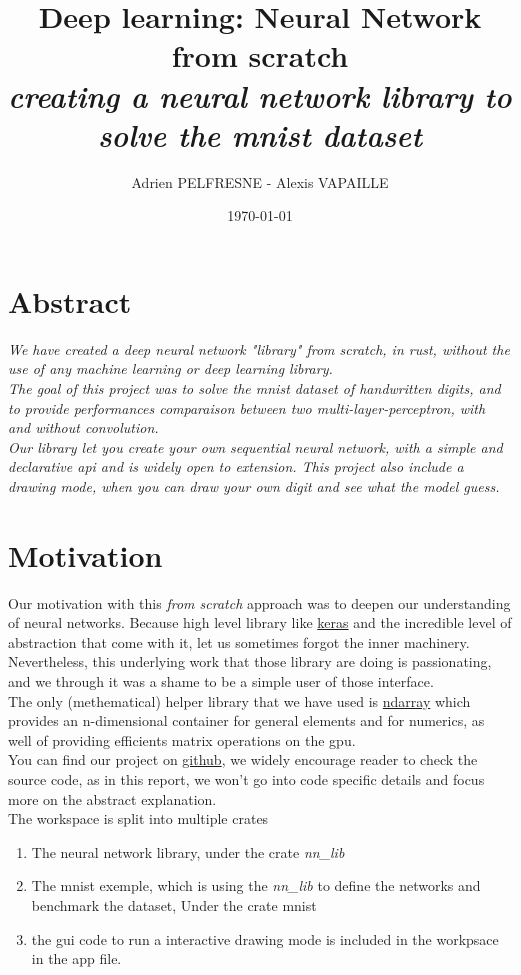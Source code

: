 \documentclass[a4paper, twocolumn, twoside]{article}
\title{Deep learning: Neural Network from scratch\\
\textit{creating a neural network library to solve the mnist dataset}}
\author{Adrien PELFRESNE - Alexis VAPAILLE}
\date{\today}
\begin{document}
	\onecolumn
    \maketitle
	\tableofcontents

	\twocolumn
	\section{Abstract}
	\textit{We have created a deep neural network "library" from scratch, in rust, without the use of any machine learning or deep learning library.\\
	The goal of this project was to solve the mnist dataset of handwritten digits, and to provide performances comparaison between
	two multi-layer-perceptron, with and without convolution.\\
	Our library let you create your own sequential neural network, with a simple and declarative api and is widely open to extension.
	This project also include a drawing mode, when you can draw your own digit and see what the model guess.
	}

	\section{Motivation}
	Our motivation with this \textit{from scratch} approach was to deepen our understanding of neural networks.
	Because high level library like \href{https://keras.io/}{keras} and the incredible level of abstraction that come with it,
	let us sometimes forgot the inner machinery. Nevertheless,
	this underlying work that those library are doing is passionating, and we through it was a shame to be a simple user of those interface.\\
	The only (methematical) helper library that we have used is \href{https://crates.io/crates/ndarray}{ndarray}
	which provides an n-dimensional container for general elements
	and for numerics, as well of providing efficients matrix operations on the gpu.\\
	You can find our project on \href{https://github.com/dirdr/neural_network_from_scratch}{github}, we widely encourage reader to check the source code,
	as in this report, we won't go into code specific details and focus more on the abstract explanation.\\
	The workspace is split into multiple crates
	\begin{enumerate}
		\item The neural network library, under the crate \textit{nn\_lib}
		\item The mnist exemple, which is using the \textit{nn\_lib} to define the networks and benchmark the dataset, Under the crate mnist
		\item the gui code to run a interactive drawing mode is included in the workpsace in the app file.
	\end{enumerate}
\end{document}
